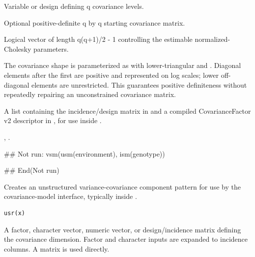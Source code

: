 \documentclass[a4paper]{book}
\begin{document}
%
\begin{Arguments}
\begin{ldescription}
\item[\code{x}] Variable or design defining q covariance levels.
\item[\code{theta}] Optional positive-definite q by q starting covariance matrix.
\item[\code{fixed}] Logical vector of length q(q+1)/2 - 1 controlling the estimable normalized-Cholesky parameters.
\end{ldescription}
\end{Arguments}
%
\begin{Details}\relax
The covariance shape is parameterized as  with lower-triangular  and .  Diagonal elements after the first are positive and represented on log scales; lower off-diagonal elements are unrestricted.  This guarantees positive definiteness without repeatedly repairing an unconstrained covariance matrix.
\end{Details}
%
\begin{Value}
A list containing the incidence/design matrix in  and a compiled CovarianceFactor v2 descriptor in , for use inside .
\end{Value}
%
\begin{SeeAlso}\relax
{}, .
\end{SeeAlso}
%
\begin{Examples}
\begin{ExampleCode}
## Not run: 
vsm(usm(environment), ism(genotype))

## End(Not run)
\end{ExampleCode}
\end{Examples}
%
\begin{Description}\relax
Creates an unstructured variance-covariance component pattern for use by the  covariance-model interface, typically inside .
\end{Description}
%
\begin{Usage}
\begin{verbatim}
usr(x)
\end{verbatim}
\end{Usage}
%
\begin{Arguments}
\begin{ldescription}
\item[\code{x}] 
A factor, character vector, numeric vector, or design/incidence matrix defining the covariance dimension. Factor and character inputs are expanded to incidence columns. A matrix is used directly.

\end{ldescription}
\end{Arguments}
\end{document}
